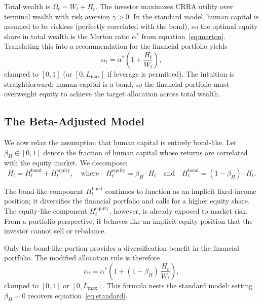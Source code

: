 \documentclass[11pt]{article}
\begin{document}
Total wealth is $\Omega_t = W_t + H_t$. The investor maximizes CRRA
utility over terminal wealth with risk aversion $\gamma > 0$. In the
standard model, human capital is assumed to be riskless (perfectly
correlated with the bond), so the optimal equity share in total wealth is
the Merton ratio $\alpha^{*}$ from equation~\eqref{eq:merton}. Translating
this into a recommendation for the financial portfolio yields
\begin{equation}\label{eq:standard}
  \alpha_t = \alpha^{*}\!\left(1 + \frac{H_t}{W_t}\right),
\end{equation}
clamped to $[0,1]$ (or $[0, L_{\max}]$ if leverage is permitted). The
intuition is straightforward: human capital is a bond, so the financial
portfolio must overweight equity to achieve the target allocation across
total wealth.

\subsection{The Beta-Adjusted Model}\label{sec:beta}

We now relax the assumption that human capital is entirely bond-like. Let
$\beta_H \in [0,1]$ denote the fraction of human capital whose returns are
correlated with the equity market. We decompose:
\begin{equation}\label{eq:decompose}
  H_t = H_t^{\text{bond}} + H_t^{\text{equity}},
  \quad\text{where}\quad
  H_t^{\text{equity}} = \beta_H \cdot H_t
  \quad\text{and}\quad
  H_t^{\text{bond}} = (1 - \beta_H)\cdot H_t.
\end{equation}

The bond-like component $H_t^{\text{bond}}$ continues to function as an
implicit fixed-income position; it diversifies the financial portfolio and
calls for a higher equity share. The equity-like component
$H_t^{\text{equity}}$, however, is already exposed to market risk. From a
portfolio perspective, it behaves like an implicit equity position that the
investor cannot sell or rebalance.

Only the bond-like portion provides a diversification benefit in the
financial portfolio. The modified allocation rule is therefore
\begin{equation}\label{eq:beta_adjusted}
  \alpha_t = \alpha^{*}\!\left(1 + (1-\beta_H)\,\frac{H_t}{W_t}\right),
\end{equation}
clamped to $[0,1]$ or $[0, L_{\max}]$. This formula nests the standard
model: setting $\beta_H = 0$ recovers equation~\eqref{eq:standard}.
\end{document}
